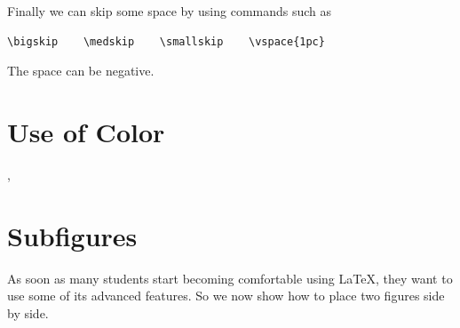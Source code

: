\documentclass[prb,12pt]{revtex4}
\begin{document}
Finally we can skip some space by using commands such as
\begin{verbatim}
\bigskip    \medskip    \smallskip    \vspace{1pc}
\end{verbatim}
The space can be negative.

\section{Use of Color}

{\color{blue}{We can change colors for emphasis}},
{\color{green}{but}} {\color{cyan}{who is going pay for the ink?}}

\section{\label{morefig}Subfigures}

As soon as many students start becoming comfortable using \LaTeX, they want
to use some of its advanced features. So we now show how to place two
figures side by side.
\end{document}
